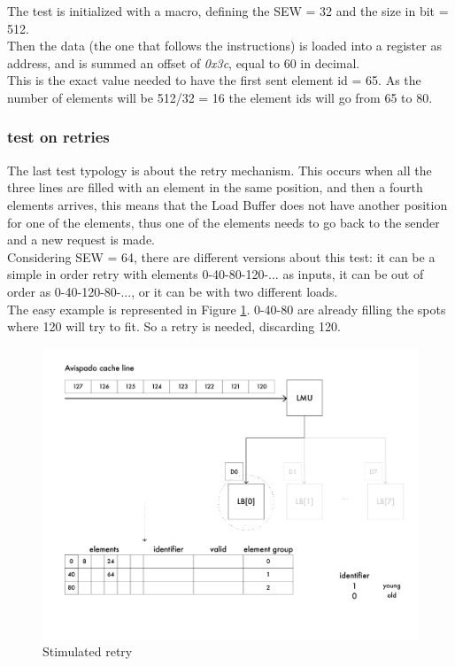 The test is initialized with a macro, defining the SEW = 32 and the size in bit = 512.\\
Then the data (the one that follows the instructions) is loaded into a register as address, and is summed an offset of \emph{0x3c}, equal to 60 in decimal.\\ This is the exact value needed to have the first sent element id = 65. As the number of elements will be 512/32 = 16 the element ids will go from 65 to 80.\\

\subsubsection{test on retries}
The last test typology is about the retry mechanism. This occurs when all the three lines are filled with an element in the same position, and then a fourth elements arrives, this means that the Load Buffer does not have another position for one of the elements, thus one of the elements needs to go back to the sender and a new request is made.\\

Considering SEW = 64, there are different versions about this test: it can be a simple in order retry with elements 0-40-80-120-... as inputs, it can be out of order as 0-40-120-80-..., or it can be with two different loads.\\

The easy example is represented in Figure \ref{cache-to-lb-ret-ex}. 0-40-80 are already filling the spots where 120 will try to fit. So a retry is needed, discarding 120.

\begin{figure}[H]
    \centering
    \includegraphics[scale = 0.5]{Chapter_2/img/cache-to-lb-ret-ex.png}
    \caption{Stimulated retry}
    \label{cache-to-lb-ret-ex}
\end{figure}


